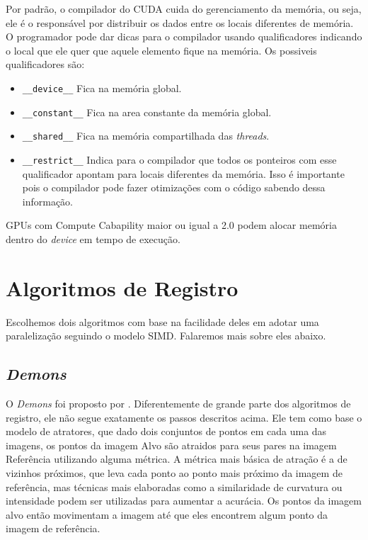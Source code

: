 Por padrão, o compilador do CUDA cuida do gerenciamento da memória, ou seja, ele é o responsável por distribuir os dados 
entre os locais diferentes de memória. O programador pode dar dicas para o compilador usando qualificadores indicando o local
que ele quer que aquele elemento fique na memória. Os possiveis qualificadores são:
\begin{itemize}
  \item \verb#__device__# Fica na memória global.
  \item \verb#__constant__#   Fica na area constante da memória global.
  \item \verb#__shared__# Fica na memória compartilhada das \textit{threads}.
  \item \verb#__restrict__# Indica para o compilador que todos os ponteiros com esse qualificador apontam para locais diferentes
                            da memória. Isso é importante pois o compilador pode fazer otimizações com o código sabendo dessa informação.   
\end{itemize}

GPUs com Compute Cabapility maior ou igual a 2.0 podem alocar memória dentro do \textit{device} em tempo de execução.

\section{Algoritmos de Registro}\label{sec:algReg}
    Escolhemos dois algoritmos com base na facilidade deles em adotar uma paralelização seguindo o modelo SIMD.
Falaremos mais sobre eles abaixo.

\subsection{\textit{Demons}}
    O \textit{Demons} foi proposto por \cite{thirion1995fast}. Diferentemente de grande parte dos algoritmos de registro,
ele não segue exatamente os passos descritos acima. Ele tem como base o modelo de atratores, que dado dois conjuntos de pontos
em cada uma das imagens, os pontos da imagem Alvo são atraidos para seus pares na imagem Referência utilizando alguma métrica.
A métrica mais básica de atração é a de vizinhos próximos, que leva cada ponto ao ponto mais próximo da imagem de 
referência, mas técnicas mais elaboradas como a similaridade de curvatura ou intensidade podem ser utilizadas para 
aumentar a acurácia. Os pontos da imagem alvo então movimentam a imagem até que eles encontrem algum ponto da imagem
de referência.

